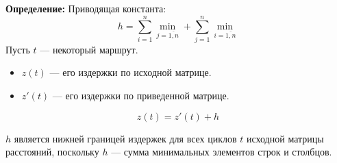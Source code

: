 \documentclass[17pt]{extarticle}
\begin{document}
\textbf{Определение:} Приводящая константа:
\[
    h=\sum_{i=1}^{n} \mathop{\min{c_{i,j}}} \limits_{j=\overline{1,n}} + \sum_{j=1}^{n} \mathop{\min{c'_{i,j}}} \limits_{i=\overline{1,n}}
\]
Пусть \( t \) — некоторый маршрут.

\begin{itemize}
    \item \( z(t) \) — его издержки по исходной матрице.
    \item \( z'(t) \) — его издержки по приведенной матрице.
\end{itemize}

\[
    z(t) = z'(t) + h
\]

\( h \) является нижней границей издержек для всех циклов \( t \) исходной матрицы расстояний, поскольку \( h \) — сумма минимальных элементов строк и столбцов.
\end{document}
